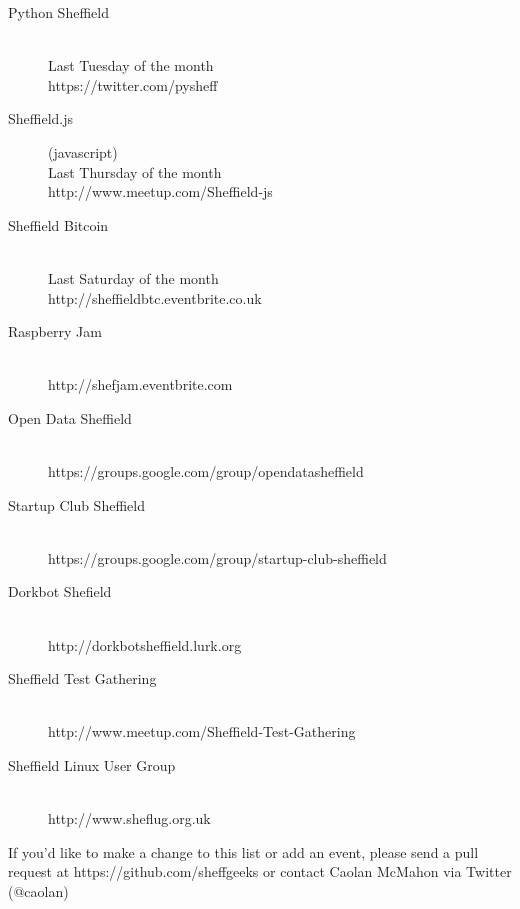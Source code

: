 \documentclass[a4paper,twocolumn]{article}
\begin{document}
\begin{description}
  \item[Python Sheffield] \hfill \\
      Last Tuesday of the month \\
      https://twitter.com/pysheff

  \item[Sheffield.js] (javascript) \hfill \\
      Last Thursday of the month \\
      http://www.meetup.com/Sheffield-js

  \item[Sheffield Bitcoin] \hfill \\
      Last Saturday of the month \\
      http://sheffieldbtc.eventbrite.co.uk

  \item[Raspberry Jam] \hfill \\
      http://shefjam.eventbrite.com

  \item[Open Data Sheffield] \hfill \\
      https://groups.google.com/group/opendatasheffield

  \item[Startup Club Sheffield] \hfill \\
      https://groups.google.com/group/startup-club-sheffield

  \item[Dorkbot Shefield] \hfill \\
      http://dorkbotsheffield.lurk.org

  \item[Sheffield Test Gathering] \hfill \\
      http://www.meetup.com/Sheffield-Test-Gathering

  \item[Sheffield Linux User Group] \hfill \\
      http://www.sheflug.org.uk

\end{description}

\qquad

If you'd like to make a change to this list or add an event,
please send a pull request at https://github.com/sheffgeeks or
contact Caolan McMahon via Twitter (@caolan)
\end{document}
